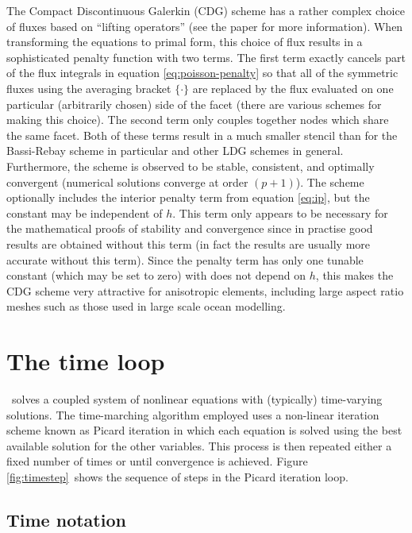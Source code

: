 The Compact Discontinuous Galerkin (CDG) scheme
\cite{peraire2008} has a rather complex choice of fluxes based on ``lifting
operators'' (see the paper for more information). When transforming the
equations to primal form, this choice of flux results in a sophisticated
penalty function with two terms. The first term exactly cancels part of the
flux integrals in equation \eqref{eq:poisson-penalty} so that all of the
symmetric fluxes using the averaging bracket $\{\cdot\}$ are replaced by the
flux evaluated on one particular (arbitrarily chosen) side of the facet
(there are various schemes for making this choice). The second term only
couples together nodes which share the same facet. Both of these terms
result in a much smaller stencil than for the Bassi-Rebay scheme in
particular and other LDG schemes in general. Furthermore, the scheme is
observed to be stable, consistent, and optimally convergent (numerical
solutions converge at order $(p+1)$). The scheme optionally includes the
interior penalty term from equation \eqref{eq:ip}, but the constant may be
independent of $h$. This term only appears to be necessary for the
mathematical proofs of stability and convergence since in practise good
results are obtained without this term (in fact the results are usually more
accurate without this term). Since the penalty term has only one tunable
constant (which may be set to zero) with does not depend on $h$, this makes
the CDG scheme very attractive for anisotropic elements, including large
aspect ratio meshes such as those used in large scale ocean modelling.

\section{The time loop}
\label{sect:ND_time_loop}

\fluidity\ solves a coupled system of nonlinear equations with (typically)
time-varying solutions. The time-marching algorithm employed uses a
non-linear iteration scheme known as Picard iteration in which each equation
is solved using the best available solution for the other variables. This
process is then repeated either a fixed number of times or until convergence
is achieved. Figure \ref{fig:timestep}\ shows the sequence of steps in the
Picard iteration loop.

\subsection{Time notation}

